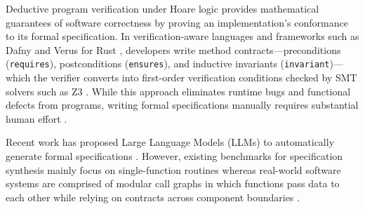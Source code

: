 \documentclass{article}
\begin{document}
Deductive program verification under Hoare logic \citep{hoare1969axiomatic} provides mathematical guarantees of software correctness by proving an implementation's conformance to its formal specification. In verification-aware languages and frameworks such as Dafny \citep{leino2010dafny} and Verus for Rust \citep{yang2025autoverus}, developers write method contracts---preconditions (\texttt{requires}), postconditions (\texttt{ensures}), and inductive invariants (\texttt{invariant})---which the verifier converts into first-order verification conditions checked by SMT solvers such as Z3 \citep{demoura2008z3}. While this approach eliminates runtime bugs and functional defects from programs, writing formal specifications manually requires substantial human effort \citep{sun2024clover, first2023baldur}.

Recent work has proposed Large Language Models (LLMs) to automatically generate formal specifications \citep{sun2024clover, wu2022autoformalization, first2023baldur}. However, existing benchmarks for specification synthesis mainly focus on single-function routines \citep{sun2024clover, austin2021program} whereas real-world software systems are comprised of modular call graphs in which functions pass data to each other while relying on contracts across component boundaries \citep{xu2025dafnycomp}.
\end{document}
